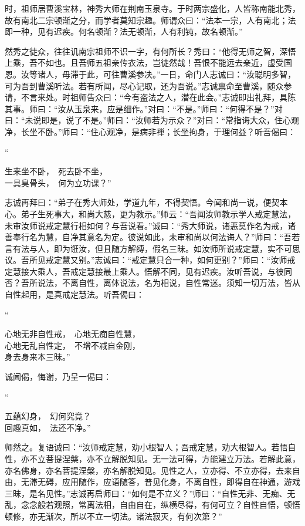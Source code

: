 \documentclass[UTF8, 11pt, oneside]{ctexart}
\newenvironment{jizi}[1]{
    \vspace{-1em}\begin{center}
        #1%
        \begin{varwidth}[t]{\linewidth}
}{
        \end{varwidth}
    \end{center}
}
\begin{document}
时，祖师居曹溪宝林，神秀大师在荆南玉泉寺。于时两宗盛化，人皆称南能北秀，故有南北二宗顿渐之分，而学者莫知宗趣。师谓众曰：“法本一宗，人有南北；法即一种，见有迟疾。何名顿渐？法无顿渐，人有利钝，故名顿渐。”

然秀之徒众，往往讥南宗祖师不识一字，有何所长？秀曰：“他得无师之智，深悟上乘，吾不如也。且吾师五祖亲传衣法，岂徒然哉！吾恨不能远去亲近，虚受国恩。汝等诸人，毋滞于此，可往曹溪参决。”一日，命门人志诚曰：“汝聪明多智，可为吾到曹溪听法。若有所闻，尽心记取，还为吾说。”志诚禀命至曹溪，随众参请，不言来处。时祖师告众曰：“今有盗法之人，潜在此会。”志诚即出礼拜，具陈其事。师曰：“汝从玉泉来，应是细作。”对曰：“不是。”师曰：“何得不是？”对曰：“未说即是，说了不是。”师曰：“汝师若为示众？”对曰：“常指诲大众，住心观净，长坐不卧。”师曰：“住心观净，是病非禅；长坐拘身，于理何益？听吾偈曰：

\begin{jizi}{“}
    生来坐不卧，　死去卧不坐， \\
    一具臭骨头，　何为立功课？”
\end{jizi}

志诚再拜曰：“弟子在秀大师处，学道九年，不得契悟。今闻和尚一说，便契本心。弟子生死事大，和尚大慈，更为教示。”师云：“吾闻汝师教示学人戒定慧法，未审汝师说戒定慧行相如何？与吾说看。”诚曰：“秀大师说，诸恶莫作名为戒，诸善奉行名为慧，自净其意名为定。彼说如此，未审和尚以何法诲人？”师曰：“吾若言有法与人，即为诳汝，但且随方解缚，假名三昧。如汝师所说戒定慧，实不可思议。吾所见戒定慧又别。”志诚曰：“戒定慧只合一种，如何更别？”师曰：“汝师戒定慧接大乘人，吾戒定慧接最上乘人。悟解不同，见有迟疾。汝听吾说，与彼同否？吾所说法，不离自性，离体说法，名为相说，自性常迷。须知一切万法，皆从自性起用，是真戒定慧法。听吾偈曰：

\begin{jizi}{“}
    心地无非自性戒，　心地无痴自性慧， \\
    心地无乱自性定，　不增不减自金刚， \\
    身去身来本三昧。”
\end{jizi}

诚闻偈，悔谢，乃呈一偈曰：

\begin{jizi}{“}
    五蕴幻身，　幻何究竟？ \\
    回趣真如，　法还不净。”
\end{jizi}

师然之。复语诚曰：“汝师戒定慧，劝小根智人；吾戒定慧，劝大根智人。若悟自性，亦不立菩提涅槃，亦不立解脱知见。无一法可得，方能建立万法。若解此意，亦名佛身，亦名菩提涅槃，亦名解脱知见。见性之人，立亦得、不立亦得，去来自由，无滞无碍，应用随作，应语随答，普见化身，不离自性，即得自在神通，游戏三昧，是名见性。”志诚再启师曰：“如何是不立义？”师曰：“自性无非、无痴、无乱，念念般若观照，常离法相，自由自在，纵横尽得，有何可立？自性自悟，顿悟顿修，亦无渐次，所以不立一切法。诸法寂灭，有何次第？”
\end{document}
